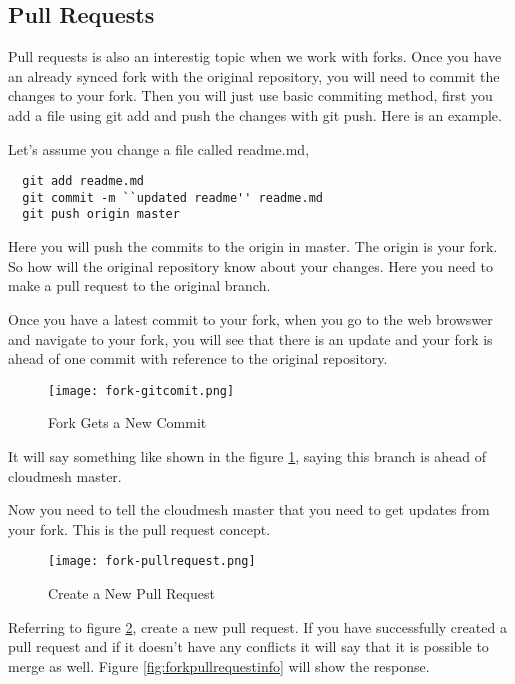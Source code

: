 \subsection{Pull Requests}

Pull requests is also an interestig topic when we work with
forks. Once you have an already synced fork with the original
repository, you will need to commit the changes to your fork. Then you
will just use basic commiting method, first you add a file using git
add and push the changes with git push. Here is an example.

Let's assume you change a file called readme.md,

\begin{lstlisting}
  git add readme.md
  git commit -m ``updated readme'' readme.md
  git push origin master
\end{lstlisting}

Here you will push the commits to the origin in master. The origin is
your fork. So how will the original repository know about your changes.
Here you need to make a pull request to the original branch. 

Once you have a latest commit to your fork, when you go to the web
browswer and navigate to your fork, you will see that there is an
update and your fork is ahead of one commit with reference to the
original repository.

\begin{figure}[htb]\label{fig:forkcommit}
\centering
\texttt{[image: fork-gitcomit.png]}
\caption{Fork Gets a New Commit
}
\end{figure}

It will say something like shown in the figure \ref{fig:forkcommit},
saying this branch is ahead of cloudmesh master.

Now you need to tell the cloudmesh master that you need to get updates
from your fork. This is the pull request concept.


\begin{figure}[htb]\label{fig:forkpullrequest}
\centering
\texttt{[image: fork-pullrequest.png]}
\caption{Create a New Pull Request
}
\end{figure}

Referring to figure \ref{fig:forkpullrequest}, create a new pull
request. If you have successfully created a pull request and if it
doesn't have any conflicts it will say that it is possible to merge as
well.  Figure \ref{fig:forkpullrequestinfo} will show the response.


